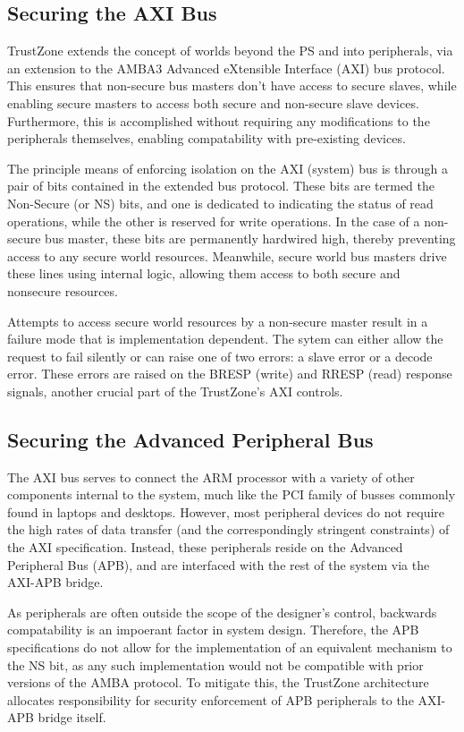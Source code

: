 \documentclass[journal]{IEEEtran}
\begin{document}
\subsection{Securing the AXI Bus}
TrustZone extends the concept of worlds beyond the PS and into peripherals,
via an extension to the AMBA3 Advanced eXtensible Interface (AXI) bus protocol. This
ensures that non-secure bus masters don't have access to secure slaves, while enabling
secure masters to access both secure and non-secure slave devices. Furthermore, this is
accomplished without requiring any modifications to the peripherals themselves, enabling
compatability with pre-existing devices.

The principle means of enforcing isolation on the AXI (system) bus is through a pair of
bits contained in the extended bus protocol. These bits are termed the Non-Secure (or NS)
bits, and one is dedicated to indicating the status of read operations, while the other is
reserved for write operations.\cite{benhani_security_2019} In the case of a non-secure bus master, these bits are 
permanently hardwired high, thereby preventing access to any secure world resources.
Meanwhile, secure world bus masters drive these lines using internal logic, allowing them
access to both secure and nonsecure resources.

Attempts to access secure world resources by a non-secure master result in a failure mode
that is implementation dependent. The sytem can either allow the request to fail silently
or can raise one of two errors: a slave error or a decode error. These errors are raised
on the BRESP (write) and RRESP (read) response signals, another crucial part of the 
TrustZone's AXI controls. \cite{benhani_security_2017}

\subsection{Securing the Advanced Peripheral Bus}
The AXI bus serves to connect the ARM processor with a variety of other components
internal to the system, much like the PCI family of busses commonly found in laptops and
desktops. However, most peripheral devices do not require the high rates of data transfer
(and the correspondingly stringent constraints) of the AXI specification. Instead, these
peripherals reside on the Advanced Peripheral Bus (APB), and are interfaced with the rest
of the system via the AXI-APB bridge.\cite{noauthor_arm_nodate}

As peripherals are often outside the scope of the designer's control, backwards
compatability is an impoerant factor in system design. Therefore, the APB specifications
do not allow for the implementation of an equivalent mechanism to the NS bit, as any such
implementation would not be compatible with prior versions of the AMBA protocol. To 
mitigate this, the TrustZone architecture allocates responsibility for security
enforcement of APB peripherals to the AXI-APB bridge itself.
\end{document}
